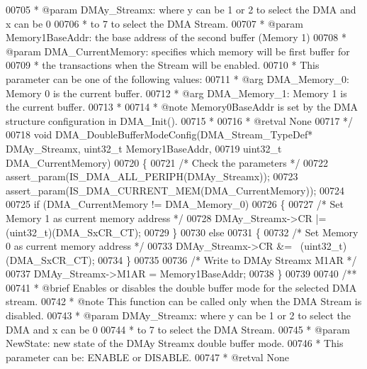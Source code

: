 \begin{DoxyCode}
00705 \textcolor{comment}{  * @param  DMAy\_Streamx: where y can be 1 or 2 to select the DMA and x can be 0}
00706 \textcolor{comment}{  *          to 7 to select the DMA Stream.}
00707 \textcolor{comment}{  * @param  Memory1BaseAddr: the base address of the second buffer (Memory 1)  }
00708 \textcolor{comment}{  * @param  DMA\_CurrentMemory: specifies which memory will be first buffer for}
00709 \textcolor{comment}{  *         the transactions when the Stream will be enabled. }
00710 \textcolor{comment}{  *          This parameter can be one of the following values:}
00711 \textcolor{comment}{  *            @arg DMA\_Memory\_0: Memory 0 is the current buffer.}
00712 \textcolor{comment}{  *            @arg DMA\_Memory\_1: Memory 1 is the current buffer.  }
00713 \textcolor{comment}{  *       }
00714 \textcolor{comment}{  * @note   Memory0BaseAddr is set by the DMA structure configuration in DMA\_Init().}
00715 \textcolor{comment}{  *   }
00716 \textcolor{comment}{  * @retval None}
00717 \textcolor{comment}{  */}
00718 \textcolor{keywordtype}{void} DMA_DoubleBufferModeConfig(DMA\_Stream\_TypeDef* DMAy\_Streamx, uint32\_t Memory1BaseAddr,
00719                                 uint32\_t DMA\_CurrentMemory)
00720 \{
00721   \textcolor{comment}{/* Check the parameters */}
00722   assert_param(IS\_DMA\_ALL\_PERIPH(DMAy\_Streamx));
00723   assert_param(IS\_DMA\_CURRENT\_MEM(DMA\_CurrentMemory));
00724 
00725   \textcolor{keywordflow}{if} (DMA\_CurrentMemory != DMA_Memory_0)
00726   \{
00727     \textcolor{comment}{/* Set Memory 1 as current memory address */}
00728     DMAy\_Streamx->CR |= (uint32\_t)(DMA_SxCR_CT);
00729   \}
00730   \textcolor{keywordflow}{else}
00731   \{
00732     \textcolor{comment}{/* Set Memory 0 as current memory address */}
00733     DMAy\_Streamx->CR &= ~(uint32\_t)(DMA_SxCR_CT);
00734   \}
00735 
00736   \textcolor{comment}{/* Write to DMAy Streamx M1AR */}
00737   DMAy\_Streamx->M1AR = Memory1BaseAddr;
00738 \}
00739 
00740 \textcolor{comment}{/**}
00741 \textcolor{comment}{  * @brief  Enables or disables the double buffer mode for the selected DMA stream.}
00742 \textcolor{comment}{  * @note   This function can be called only when the DMA Stream is disabled.  }
00743 \textcolor{comment}{  * @param  DMAy\_Streamx: where y can be 1 or 2 to select the DMA and x can be 0}
00744 \textcolor{comment}{  *          to 7 to select the DMA Stream.}
00745 \textcolor{comment}{  * @param  NewState: new state of the DMAy Streamx double buffer mode. }
00746 \textcolor{comment}{  *          This parameter can be: ENABLE or DISABLE.}
00747 \textcolor{comment}{  * @retval None}

\end{DoxyCode}
